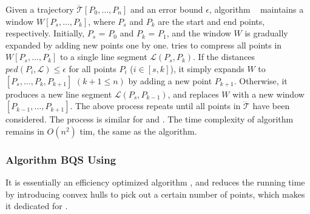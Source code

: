 Given a trajectory $\dddot{\mathcal{T}}[P_0, \ldots, P_n]$ and an error bound $\epsilon$, algorithm \opwa~\cite{Meratnia:Spatiotemporal} maintains a window $W[P_s, \ldots, P_k]$, where $P_s$ and $P_k$ are the start and end points, respectively. Initially, $P_s$ = $P_0$ and $P_k$ = $P_1$, and the window $W$ is gradually expanded by adding new points one by one. \opwa tries to compress all points in $W[P_s, \ldots, P_k]$ to a single line segment $\mathcal{L}(P_{s}, P_{k})$. If the distances $ped(P_i, {\mathcal{L}})\le \epsilon$ for all points $P_i$ ($i\in[s, k]$), it simply expands $W$ to $[P_s, \ldots, P_k, P_{k+1}]$ $(k+1\le n)$ by adding a new point $P_{k+1}$. Otherwise, it produces a new line segment $\mathcal{L}(P_{s}, P_{k-1})$, and replaces $W$ with a new window $[P_{k-1},\ldots,P_{k+1}]$.  The above process repeats until all points in $\dddot{\mathcal{T}}$ have been considered. The process is similar for \sed and \dad.
%
%
The time complexity of algorithm \opwa remains in $O(n^2)$ tim, the same as the \dpa algorithm.


\subsubsection{Algorithm BQS Using \ped \cite{Liu:BQS}}
It is essentially an efficiency optimized \opwa algorithm \cite{Meratnia:Spatiotemporal}, and reduces the running time by introducing convex hulls to pick out a certain number of points, which makes it dedicated for \ped.

